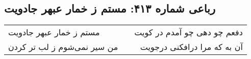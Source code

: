 \begin{center}
\section*{رباعی شماره ۴۱۳: مستم ز خمار عبهر جادویت}
\label{sec:0413}
\begin{longtable}{l p{0.5cm} r}
مستم ز خمار عبهر جادویت
&&
دفعم چو دهی چو آمدم در کویت
\\
من سیر نمی‌شوم ز لب تر کردن
&&
آن به که مرا درافکنی درجویت
\\
\end{longtable}
\end{center}
